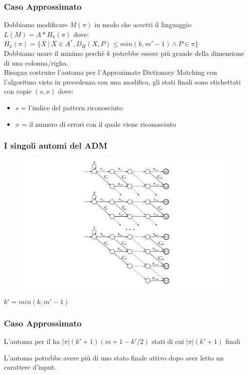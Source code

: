 \documentclass{beamer}
\begin{document}
\begin{frame}
\frametitle{Caso Approssimato}
Dobbiamo modificare $M(\pi)$ in modo che accetti il linguaggio $L(M) = A * H_k(\pi)$ dove: $H_k(\pi) = \{X\ |\ X \in A^*, D_H(X,P) \leq min(k,m'-1) \wedge P\in \pi \}$\\
Dobbiamo usare il minimo perchè $k$ potrebbe essere più grande della dimensione di una colonna/righa.\\
Bisogna costruire l'automa per l'Approximate Dictionary Matching con l'algoritmo visto in precedenza con una modifica, gli stati finali sono etichettati con copie $(s,x)$ dove:
\begin{itemize}
\item $s$ = l'indice del pattern riconosciuto
\item $x$ = il numero di errori con il quale viene riconosciuto
\end{itemize}
\end{frame}

\begin{frame}
\frametitle{I singoli automi del ADM}
\begin{figure}[p]
    \includegraphics[width=1\textwidth]{ADM.png}
\end{figure}

\end{frame}

\begin{frame}

\begin{definition}
$k' = min(k, m'-1)$
\end{definition}

\frametitle{Caso Approssimato}
  \begin{theorem}[]
  L'automa per il ha $|\pi|(k'+1)(m+1 - k'/2)$ stati di cui $|\pi|(k'+1)$ finali
  \end{theorem}
\begin{theorem}[]
L'automa potrebbe avere più di uno stato finale attivo dopo aver letto un carattere d'input.
\end{theorem}
\end{frame}
\end{document}
